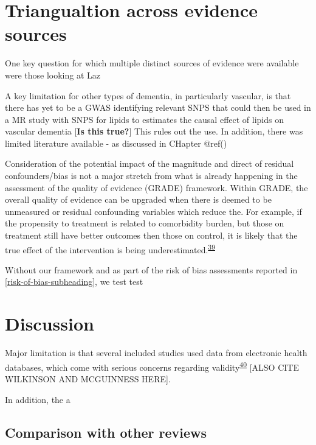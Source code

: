 \documentclass[a4paper, twoside]{templates/ociamthesis}
\begin{document}
\hypertarget{triangualtion-across-evidence-sources}{%
\section{Triangualtion across evidence sources}\label{triangualtion-across-evidence-sources}}

One key question for which multiple distinct sources of evidence were available were those looking at Laz

A key limitation for other types of dementia, in particularly vascular, is that there has yet to be a GWAS identifying relevant SNPS that could then be used in a MR study with SNPS for lipids to estimates the causal effect of lipids on vascular dementia {[}\textbf{Is this true?}{]} This rules out the use. In addition, there was limited literature available - as discussed in CHapter @ref()

Consideration of the potential impact of the magnitude and direct of residual confounders/bias is not a major stretch from what is already happening in the assessment of the quality of evidence (GRADE) framework. Within GRADE, the overall quality of evidence can be upgraded when there is deemed to be unmeasured or residual confounding variables which reduce the. For example, if the propensity to treatment is related to comorbidity burden, but those on treatment still have better outcomes then those on control, it is likely that the true effect of the intervention is being underestimated.\textsuperscript{\protect\hyperlink{ref-guyatt2011}{39}}

Without our framework and as part of the risk of bias assessments reported in \ref{risk-of-bias-subheading}, we test test

\hypertarget{discussion-1}{%
\section{Discussion}\label{discussion-1}}

Major limitation is that several included studies used data from electronic health databases, which come with serious concerns regarding validity\textsuperscript{\protect\hyperlink{ref-hsieh2019}{40}} {[}ALSO CITE WILKINSON AND MCGUINNESS HERE{]}.

In addition, the a

\hypertarget{comparison-with-other-reviews}{%
\subsection{Comparison with other reviews}\label{comparison-with-other-reviews}}
\end{document}
